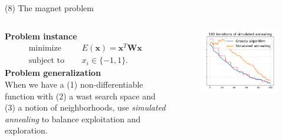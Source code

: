 \documentclass[11pt, aspectratio=149]{beamer}
\theoremstyle{plain}
\begin{document}
\begin{frame}[fragile, t]{(8) The magnet problem}
	\begin{columns}
		\begin{column}{0.55\textwidth}
			\textbf{Problem instance}
			\begin{align*}
			\text{minimize } \quad & E(\mathbf{x}) = \mathbf{x}^T \mathbf{W} \mathbf{x}  \\
			\text{subject to } \quad & x_i \in \{-1, 1\}  .
			\end{align*}
			\textbf{Problem generalization}
			\\
			\vspace*{0.5em} 
			When we have a (1) non-differentiable function with (2) a wast search space and (3) a notion of neighborhoods, use \emph{simulated annealing} to balance exploitation and exploration.
		\end{column}
		\begin{column}{0.45\textwidth}%
	\begin{figure}
		\centering
		\includegraphics[width=1.1\linewidth]{figs/simulated_annealing.pdf}
	\end{figure}
		\end{column}
	\end{columns}
\end{frame}

\end{document}
